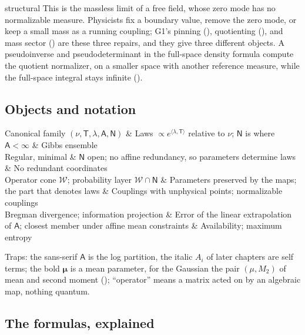 \begin{analogy}{structural}
This is the massless limit of a free field, whose zero mode has no normalizable measure. Physicists fix a
boundary value, remove the zero mode, or keep a small mass as a running coupling; G1's pinning
(), quotienting (), and mass sector
() are these three repairs, and they give three different objects. A
pseudoinverse and pseudodeterminant in the full-space density formula compute the quotient normalizer,
on a smaller space with another reference measure, while the full-space integral stays infinite
().
\end{analogy}

\subsection{Objects and notation}

\begin{decoder}
Canonical family \((\nu,\mathsf T,\lambda,\mathsf A,\mathsf N)\) & Laws \(\propto e^{\langle\lambda,\mathsf T\rangle}\) relative to \(\nu\); \(\mathsf N\) is where \(\mathsf A<\infty\) & Gibbs ensemble\\
Regular, minimal & \(\mathsf N\) open; no affine redundancy, so parameters determine laws & No redundant coordinates\\
Operator cone \(\mathcal W\); probability layer \(\mathcal W\cap\mathsf N\) & Parameters preserved by the maps; the part that denotes laws & Couplings with unphysical points; normalizable couplings\\
Bregman divergence; information projection & Error of the linear extrapolation of \(\mathsf A\); closest member under affine mean constraints & Availability; maximum entropy\\
\end{decoder}

Traps: the sans-serif \(\mathsf A\) is the log partition, the italic \(A_i\) of later chapters are self
terms; the bold \(\boldsymbol\mu\) is a mean parameter, for the Gaussian the pair \((\mu,M_2)\) of mean
and second moment (); ``operator'' means a matrix acted on by an
algebraic map, nothing quantum.

\subsection{The formulas, explained}

